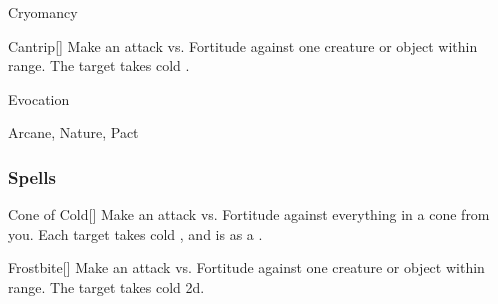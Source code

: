 \newpage
\begin{spellsection}{Cryomancy}

\begin{spellheader}
\end{spellheader}


\begin{ability}{Cantrip}[]
Make an attack vs. Fortitude against one creature or object within \rngmed range.
\hit The target takes cold .
\end{ability}




 Evocation

 Arcane, Nature, Pact
\end{spellsection}


\subsubsection{Spells}


\lowercase{\hypertarget{spell:Cone of Cold}{}}\label{spell:Cone of Cold}
\begin{ability}[\nth{1}]{\hypertarget{spell:Cone of Cold}{Cone of Cold}}[]
Make an attack vs. Fortitude against everything in a \areamed cone from you.
\hit Each target takes cold , and is  as a .
\end{ability}
\vspace{0.25em}



\lowercase{\hypertarget{spell:Frostbite}{}}\label{spell:Frostbite}
\begin{ability}[\nth{1}]{\hypertarget{spell:Frostbite}{Frostbite}}[]
Make an attack vs. Fortitude against one creature or object within \rngmed range.
\hit The target takes cold  \plus2d.
\end{ability}
\vspace{0.25em}



